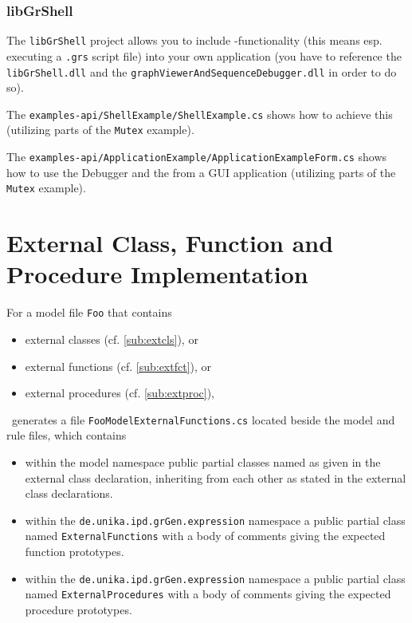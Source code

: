 \subsubsection*{libGrShell}
The \texttt{libGrShell} project allows you to include \GrShell{}-functionality (this means esp. executing a \texttt{.grs} script file) into your own application (you have to reference the \texttt{libGrShell.dll} and the \texttt{graphViewerAndSequenceDebugger.dll} in order to do so).

The \texttt{examples-api/ShellExample/ShellExample.cs} shows how to achieve this (utilizing parts of the \texttt{Mutex} example).

The \texttt{examples-api/ApplicationExample/ApplicationExampleForm.cs} shows how to use the Debugger and the \GrShell{} from a GUI application (utilizing parts of the \texttt{Mutex} example).


\section{External Class, Function and Procedure Implementation}\label{sub:extclsfctimpl}

For a model file \texttt{Foo} that contains 
\begin{itemize}
	\item external classes (cf. \ref{sub:extcls}), or
	\item external functions (cf. \ref{sub:extfct}), or 
	\item external procedures (cf. \ref{sub:extproc}), 
\end{itemize}
\GrG~generates a file \texttt{FooModelExternalFunctions.cs} located beside the model and rule files, which contains
\begin{itemize}
	\item within the model namespace public partial classes named as given in the external class declaration,
inheriting from each other as stated in the external class declarations.
	\item within the \texttt{de.unika.ipd.grGen.expression} namespace a public partial class named \texttt{ExternalFunctions} with a body of comments giving the expected function prototypes.
	\item within the \texttt{de.unika.ipd.grGen.expression} namespace a public partial class named \texttt{ExternalProcedures} with a body of comments giving the expected procedure prototypes.
\end{itemize}

